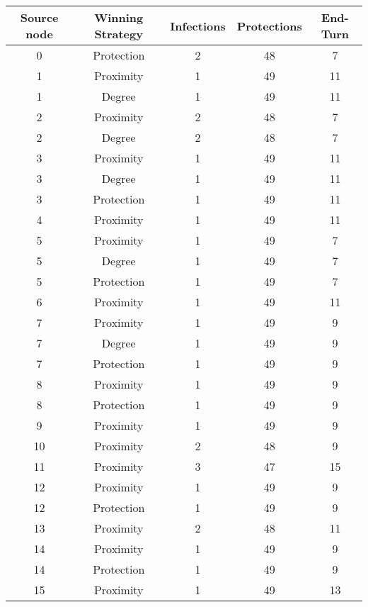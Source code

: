 \documentclass[results.tex]{subfiles}
\begin{document}
\begin{center}
  \begin{tabular}{| c || c | c | c | c |}
    \hline
    {\bfseries Source node} & {\bfseries Winning Strategy} & {\bfseries Infections} & {\bfseries Protections} & {\bfseries End-Turn} \\  %
    \hline\hline
    0 & Protection & 2 & 48 & 7 \\ 
    \hline
    1 & Proximity & 1 & 49 & 11 \\ 
    \hline
    1 & Degree & 1 & 49 & 11 \\ 
    \hline
    2 & Proximity & 2 & 48 & 7 \\ 
    \hline
    2 & Degree & 2 & 48 & 7 \\ 
    \hline
    3 & Proximity & 1 & 49 & 11 \\ 
    \hline
    3 & Degree & 1 & 49 & 11 \\ 
    \hline
    3 & Protection & 1 & 49 & 11 \\ 
    \hline
    4 & Proximity & 1 & 49 & 11 \\ 
    \hline
    5 & Proximity & 1 & 49 & 7 \\ 
    \hline
    5 & Degree & 1 & 49 & 7 \\ 
    \hline
    5 & Protection & 1 & 49 & 7 \\ 
    \hline
    6 & Proximity & 1 & 49 & 11 \\ 
    \hline
    7 & Proximity & 1 & 49 & 9 \\ 
    \hline
    7 & Degree & 1 & 49 & 9 \\ 
    \hline
    7 & Protection & 1 & 49 & 9 \\ 
    \hline
    8 & Proximity & 1 & 49 & 9 \\ 
    \hline
    8 & Protection & 1 & 49 & 9 \\ 
    \hline
    9 & Proximity & 1 & 49 & 9 \\ 
    \hline
    10 & Proximity & 2 & 48 & 9 \\ 
    \hline
    11 & Proximity & 3 & 47 & 15 \\ 
    \hline
    12 & Proximity & 1 & 49 & 9 \\ 
    \hline
    12 & Protection & 1 & 49 & 9 \\ 
    \hline
    13 & Proximity & 2 & 48 & 11 \\ 
    \hline
    14 & Proximity & 1 & 49 & 9 \\ 
    \hline
    14 & Protection & 1 & 49 & 9 \\ 
    \hline
    15 & Proximity & 1 & 49 & 13 \\ 

\end{tabular}
\end{center}
\end{document}
